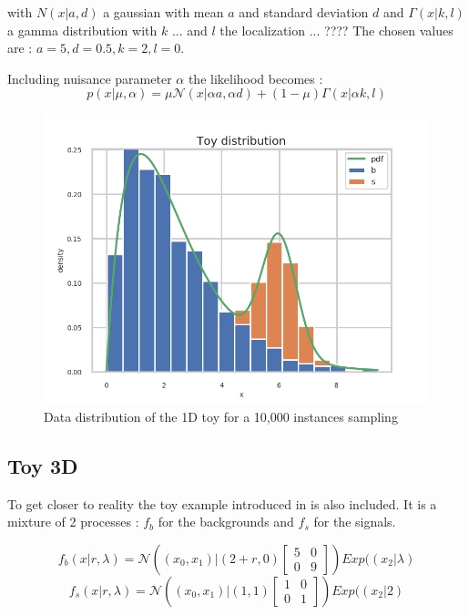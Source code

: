 with $N(x|a, d)$ a gaussian with mean $a$ and standard deviation $d$ and $\Gamma(x|k, l)$ a gamma distribution with $k$ ... and $l$ the localization  ... ????
The chosen values are : $a = 5, d=0.5, k=2, l=0$.


Including nuisance parameter $\alpha$ the likelihood becomes :
$$
    p(x | \mu, \alpha) = \mu \mathcal N(x|\alpha a, \alpha d) + (1-\mu) \Gamma(x|\alpha k, l)
$$

\begin{figure}[htb]
    \includegraphics[width=\linewidth]{minitoy/distrib.png}
    \caption{Data distribution of the 1D toy for a 10,000 instances sampling}
    \label{fig:minitoy_distrib}
\end{figure}






\subsection{Toy 3D} %
\label{sub:toy_3d}

To get closer to reality the toy example introduced in \cite{DECASTRO2019170inferno} is also included.
It is a mixture of 2 processes : $f_b$ for the backgrounds and $f_s$ for the signals.

\begin{equation}
	f_b (x|r, \lambda) = \mathcal N \left ( (x_0, x_1) | (2+r, 0) 
	\begin{bmatrix} 5 & 0 \\ 0 & 9 \end{bmatrix} \right ) Exp((x_2| \lambda)
\end{equation}
\begin{equation}
	f_s (x|r, \lambda) = \mathcal N \left ( (x_0, x_1) | (1, 1) 
	\begin{bmatrix} 1 & 0 \\ 0 & 1 \end{bmatrix} \right ) Exp((x_2| 2)
\end{equation}

